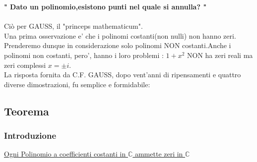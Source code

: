 \documentclass[fontsize = 20px, paper = a4]{article}
\begin{document}
\indent \textbf{" Dato un polinomio,esistono punti nel quale si annulla? "}\\ \\
Ciò per GAUSS, il "princeps mathematicum".\\
Una prima osservazione e' che i polinomi costanti(non nulli) non hanno zeri. Prenderemo dunque in considerazione solo polinomi NON costanti.Anche i polinomi non costanti, pero', hanno i loro problemi : $1 + x^2$ NON ha zeri reali ma zeri complessi $x = \pm i$.\\
La risposta fornita da C.F. GAUSS, dopo vent'anni di ripensamenti e quattro diverse dimostrazioni, fu semplice e formidabile: 
\subsection{Teorema}
\subsubsection{Introduzione}
\hspace*{1.3cm} \underline {Ogni Polinomio a coefficienti costanti in $\mathbb{C}$ ammette zeri in $\mathbb{C}$} \\ \\ 
\end{document}
